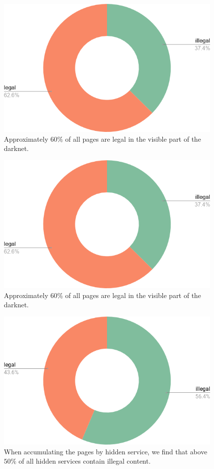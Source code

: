 \ifdgruyter
  \begin{figure}[H]
    \includegraphics[width=\linewidth]{images/legalByContent.png}
    \caption{Approximately $60\%$ of all pages are legal in the visible part of the darknet.}
    \label{fig:legalByContent}
  \end{figure}
\fi

\iflncs
  \begin{figure}[H]
    \centering
    \includegraphics[width=0.6\linewidth]{images/legalByContent.png}
    \caption{Approximately $60\%$ of all pages are legal in the visible part of the darknet.}
    \label{fig:legalByContent}
  \end{figure}
\fi

\ifdgruyter
  \begin{figure}[H]
    \includegraphics[width=\linewidth]{images/legalByHost.png}
    \caption{When accumulating the pages by hidden service, we find that above $50\%$ of all hidden services contain illegal content.}
    \label{fig:legalByHost}
  \end{figure}
\fi


